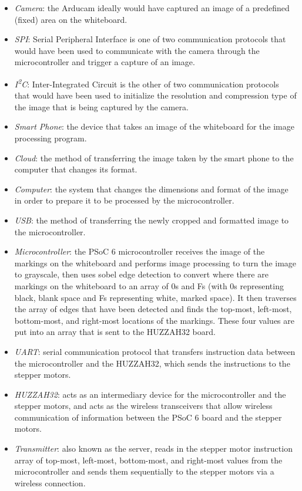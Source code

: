 \begin{itemize}
	\item \textit{Camera}: the Arducam ideally would have captured an image of a predefined (fixed) area on the whiteboard.
	\item \textit{SPI}: Serial Peripheral Interface is one of two communication protocols that would have been used to communicate with the camera through the microcontroller and trigger a capture of an image.
	\item \textit{I\textsuperscript{2}C}: Inter-Integrated Circuit is the other of two communication protocols that would have been used to initialize the resolution and compression type of the image that is being captured by the camera.
	\item \textit{Smart Phone}: the device that takes an image of the whiteboard for the image processing program.
	\item \textit{Cloud}: the method of transferring the image taken by the smart phone to the computer that changes its format.
	\item \textit{Computer}: the system that changes the dimensions and format of the image in order to prepare it to be processed by the microcontroller.
	\item \textit{USB}: the method of transferring the newly cropped and formatted image to the microcontroller.
	\item \textit{Microcontroller}: the PSoC 6 microcontroller receives the image of the markings on the whiteboard and performs image processing to turn the image to grayscale, then uses sobel edge detection to convert where there are markings on the whiteboard to an array of 0s and Fs (with 0s representing black, blank space and Fs representing white, marked space). It then traverses the array of edges that have been detected and finds the top-most, left-most, bottom-most, and right-most locations of the markings. These four values are put into an array that is sent to the HUZZAH32 board.
	\item \textit{UART}: serial communication protocol that transfers instruction data between the microcontroller and the HUZZAH32, which sends the instructions to the stepper motors.
	\item \textit{HUZZAH32}: acts as an intermediary device for the microcontroller and the stepper motors, and acts as the wireless transceivers that allow wireless communication of information between the PSoC 6 board and the stepper motors.
	\item \textit{Transmitter}: also known as the server, reads in the stepper motor instruction array of top-most, left-most, bottom-most, and right-most values from the microcontroller and sends them sequentially to the stepper motors via a wireless connection.

\end{itemize}
